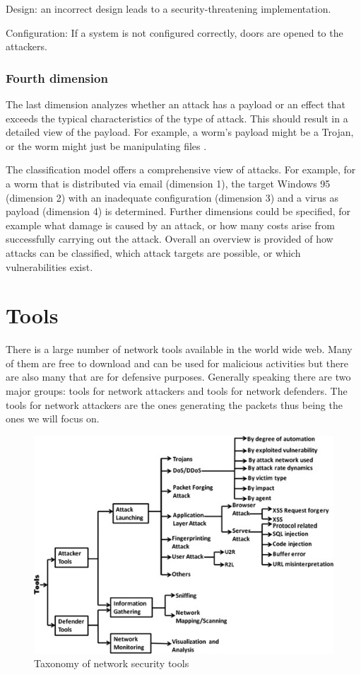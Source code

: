 \documentclass[conference]{IEEEtran}
\begin{document}
\smallskip Design: an incorrect design leads to a security-threatening implementation.

\smallskip Configuration: If a system is not configured correctly, doors are opened to the attackers.

\medskip \subsubsection{Fourth dimension}The last dimension analyzes whether an attack has a payload or an effect that exceeds the typical characteristics of the type of attack. This should result in a detailed view of the payload. For example, a worm's payload might be a Trojan, or the worm might just be manipulating files \cite{b5}.

\medskip The classification model offers a comprehensive view of attacks. For example, for a worm that is distributed via email (dimension 1), the target Windows 95 (dimension 2) with an inadequate configuration (dimension 3) and a virus as payload (dimension 4) is determined. Further dimensions could be specified, for example what damage is caused by an attack, or how many costs arise from successfully carrying out the attack. Overall an overview is provided of how attacks can be classified, which attack targets are possible, or which vulnerabilities exist.


\section{Tools}

There is a large number of network tools available in the world wide web. Many of them are free to download and can be used for malicious activities but there are also many that are for defensive purposes. Generally speaking there are two major groups: tools for network attackers and tools for network defenders.\cite{b1} The tools for network attackers are the ones generating the packets thus being the ones we will focus on. 

\begin{figure}[htbp]  
\centerline{\includegraphics[scale=.55]{network-tools.jpg}}
\caption{Taxonomy of network security tools \cite{b1}}
\end{figure}
\end{document}
